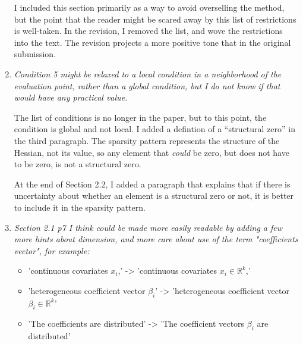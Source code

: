 \documentclass{article}
\newcommand{\Real}[1]{\mathbb{R}^{#1}}
\newenvironment{revQuote}{\itshape}{\vspace{\baselineskip}}
\newenvironment{response}{\normalfont}{\vspace{\baselineskip}}
\begin{document}
\begin{enumerate}[align=left]
\begin{revQuote}
  \end{revQuote}

  \begin{response}
I included this section primarily as a way to avoid overselling the
method, but the point that the reader might be scared away by this list of
restrictions is well-taken.  In the revision, I removed the list, and
wove the restrictions into the text.  The revision projects a more
positive tone that in the original submission.
\end{response}

\item \begin{revQuote}
Condition 5 might be relaxed to a local condition in a neighborhood of
the evaluation point, rather than a global condition, but I do not know if
that would have any practical value.
  \end{revQuote}

\begin{response}
  The list of conditions is no longer in the paper, but to this point, the
  condition is global and not local.  I added a defintion of a ``structural zero'' in the third
  paragraph. The sparsity pattern represents the structure of the
  Hessian, not its value, so any element that \emph{could} be zero,
  but does not have to be zero, is not a structural zero.

   At the end of Section 2.2, I added a paragraph that explains that
   if there is uncertainty about whether an element is a structural
   zero or not, it is better to include it in the sparsity pattern.
\end{response}

\item \begin{revQuote}
Section 2.1 p7 I think could be made more easily readable by adding a few
more hints about dimension, and more care about use of the term 
"coefficients vector", for example:
\begin{itemize}
  \item 'continuous covariates $x_i$,' -> 'continuous covariates $x_i \in
\Real{k}$,'

  \item  'heterogeneous coefficient vector $\beta_i$' -> 'heterogeneous
coefficient vector $\beta_i \in \Real{k}$'

  \item 'The coefficients are distributed' -> 'The coefficient vectors
$\beta_i$ are distributed'
\end{itemize}
  \end{revQuote}


\end{enumerate}
\end{document}
